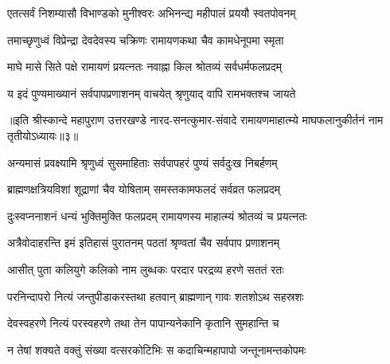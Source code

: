  


\twolineshloka
{एतत्सर्वं निशम्यासौ विभाण्डको मुनीश्वरः}
{अभिनन्द्य महीपालं प्रययौ स्वतपोवनम्}%

 

\twolineshloka
{तमाच्छृणुध्वं विप्रेन्द्रा देवदेवस्य चक्रिणः}
{रामायणकथा चैव कामधेनूपमा स्मृता}%

 

\twolineshloka
{माघे मासे सिते पक्षे रामायणं प्रयत्‍नतः}
{नवाह्ना किल श्रोतव्यं सर्वधर्मफलप्रदम्}%

 

\twolineshloka
{य इदं पुण्यमाख्यानं सर्वपापप्रणाशनम्}
{वाचयेत् श्रृणुयाद् वापि रामभक्तश्च जायते}%

 

॥इति श्रीस्कान्दे महापुराण उत्तरखण्डे नारद-सनत्कुमार-संवादे रामायणमाहात्म्ये माघफलानुकीर्तनं नाम तृतीयोऽध्यायः॥३॥
 

 


\twolineshloka
{अन्यमासं प्रवक्ष्यामि श्रृणुध्वं सुसमाहिताः}
{सर्वपापहरं पुण्यं सर्वदुःख निबर्हणम्}%

 

\twolineshloka
{ब्राह्मणक्षत्रियविशां शूद्राणां चैव योषिताम्}
{समस्तकामफलदं सर्वव्रत फलप्रदम्}%

 

\twolineshloka
{दुःस्वप्ननाशनं धन्यं भुक्तिमुक्ति फलप्रदम्}
{रामायणस्य माहात्म्यं श्रोतव्यं च प्रयत्‍नतः}%

 

\twolineshloka
{अत्रैवोदाहरन्ति इमं इतिहासं पुरातनम्}
{पठतां श्रृण्वतां चैव सर्वपाप प्रणाशनम्}%

 

\twolineshloka
{आसीत् पुता कलियुगे कलिको नाम लुब्धकः}
{परदार परद्रव्य हरणे सततं रतः}%

 

\twolineshloka
{परनिन्दापरो नित्यं जन्तुपीडाकरस्तथा}
{हतवान् ब्राह्मणान् गावः शतशोऽथ सहस्रशः}%

 

\twolineshloka
{देवस्वहरणे नित्यं परस्वहरणे तथा}
{तेन पापान्यनेकानि कृतानि सुमहान्ति च}%

 

\twolineshloka
{न तेषां शक्यते वक्तुं संख्या वत्सरकोटिभिः}
{स कदाचिन्महापापो जन्तूनामन्तकोपमः}%

 

